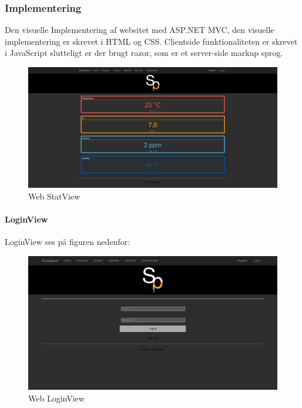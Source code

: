 \subsubsection{Implementering}
Den visuelle Implementering af websitet med ASP.NET MVC, den visuelle implementering er skrevet i HTML og CSS. Clientside funktionaliteten er skrevet i JavaScript slutteligt er der brugt razor, som er et server-side markup sprog.

\begin{figure}
	\centering
	\includegraphics[width=1.0\linewidth]{figs/implementering/web_statview}
	\caption{Web StatView}
	\label{fig:webstatview}
\end{figure}

\paragraph{LoginView}
LoginView ses på figuren nedenfor:

\begin{figure}
	\centering
	\includegraphics[width=1.0\linewidth]{figs/implementering/web_login}
	\caption{Web LoginView}
	\label{fig:webloginview}
\end{figure}

